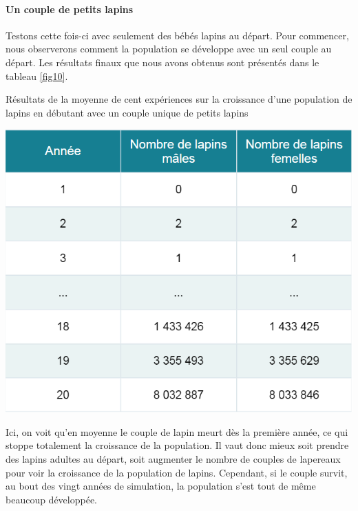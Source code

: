 \documentclass[12pt]{article}
\begin{document}
    \paragraph{Un couple de petits lapins}\hspace{0.5cm}
    \newline
    \par Testons cette fois-ci avec seulement des bébés lapins au départ. Pour commencer, nous observerons comment la population se développe avec un seul couple au départ. Les résultats finaux que nous avons obtenus sont présentés dans le tableau \ref{fig10}.
    \begin{table}[!h]
	    \centering
	    \caption{Résultats de la moyenne de cent expériences sur la croissance d'une population de lapins en débutant avec un couple unique de petits lapins}
        \includegraphics[scale = 0.8]{Photos/mean2LapP.png}
	    \label{fig10}
	\end{table}
    \par
    Ici, on voit qu'en moyenne le couple de lapin meurt dès la première année, ce qui stoppe totalement la croissance de la population. Il vaut donc mieux soit prendre des lapins adultes au départ, soit augmenter le nombre de couples de lapereaux pour voir la croissance de la population de lapins. Cependant, si le couple survit, au bout des vingt années de simulation, la population s'est tout de même beaucoup développée.
\end{document}
